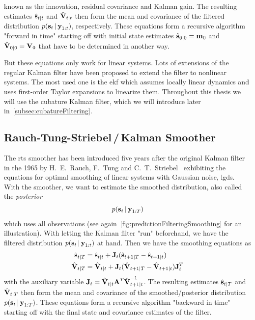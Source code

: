 		known as the innovation, residual covariance and Kalman gain. The resulting estimates \( \hat{\boldsymbol{\mathrm{s}}}_{t \vert t} \) and \( \hat{\boldsymbol{\mathrm{V}}}_{t \vert t} \) then form the mean and covariance of the filtered distribution \( p(\boldsymbol{\mathrm{s}}_t \,\vert\, \boldsymbol{\mathrm{y}}_{1:t}) \), respectively. These equations form a recursive algorithm "forward in time" starting off with initial state estimates \( \hat{\boldsymbol{\mathrm{s}}}_{0 \vert 0} = \boldsymbol{\mathrm{m}}_0 \) and \( \hat{\boldsymbol{\mathrm{V}}}_{0 \vert 0} = \boldsymbol{\mathrm{V}}_0 \) that have to be determined in another way.

		But these equations only work for linear systems. Lots of extensions of the regular Kalman filter have been proposed to extend the filter to nonlinear systems. The most used one is the \ac{ekf} which assumes locally linear dynamics and uses first-order Taylor expansions to linearize them. Throughout this thesis we will use the cubature Kalman filter, which we will introduce later in~\autoref{subsec:cubatureFiltering}.

	\subsection{Rauch-Tung-Striebel\,/\,Kalman Smoother}
		The \ac{rts} smoother has been introduced five years after the original Kalman filter in the 1965 by H.~E.~Rauch, F.~Tung and C.~T.~Striebel~\cite{rauchMaximumLikelihoodEstimates1965} exhibiting the equations for optimal smoothing of linear systems with Gaussian noise, \ie \ac{lgds}. With the smoother, we want to estimate the smoothed distribution, also called the \emph{posterior}
		\begin{equation*}
			p(\boldsymbol{\mathrm{s}}_t \,\vert\, \boldsymbol{\mathrm{y}}_{1:T})
		\end{equation*}
		which uses all observations (see again~\autoref{fig:predictionFilteringSmoothing} for an illustration). With letting the Kalman filter "run" beforehand, we have the filtered distribution \( p(\boldsymbol{\mathrm{s}}_t \,\vert\, \boldsymbol{\mathrm{y}}_{1:t}) \) at hand. Then we have the smoothing equations as
		\begin{align}
			\hat{\boldsymbol{\mathrm{s}}}_{t \vert T} &= \hat{\boldsymbol{\mathrm{s}}}_{t \vert t} + \boldsymbol{\mathrm{J}}_t (\hat{\boldsymbol{\mathrm{s}}}_{t + 1 \vert T} - \hat{\boldsymbol{\mathrm{s}}}_{t + 1 \vert t})  \label{eqn:rtsState} \\
			\hat{\boldsymbol{\mathrm{V}}}_{t \vert T} &= \hat{\boldsymbol{\mathrm{V}}}_{t \vert t} + \boldsymbol{\mathrm{J}}_t (\hat{\boldsymbol{\mathrm{V}}}_{t + 1 \vert T} - \hat{\boldsymbol{\mathrm{V}}}_{t + 1 \vert t}) \boldsymbol{\mathrm{J}}_t^T  \label{eqn:rtsCov}
		\end{align}
		with the auxiliary variable \( \boldsymbol{\mathrm{J}}_t = \hat{\boldsymbol{\mathrm{V}}}_{t \vert t} \boldsymbol{\mathrm{A}}^T \hat{\boldsymbol{\mathrm{V}}}_{t + 1 \vert t}^{-1} \). The resulting estimates \( \hat{\boldsymbol{\mathrm{s}}}_{t \vert T} \) and \( \hat{\boldsymbol{\mathrm{V}}}_{t \vert T} \) then form the mean and covariance of the smoothed/posterior distribution \( p(\boldsymbol{\mathrm{s}}_t \,\vert\, \boldsymbol{\mathrm{y}}_{1:T}) \). These equations form a recursive algorithm "backward in time" starting off with the final state and covariance estimates of the filter.

